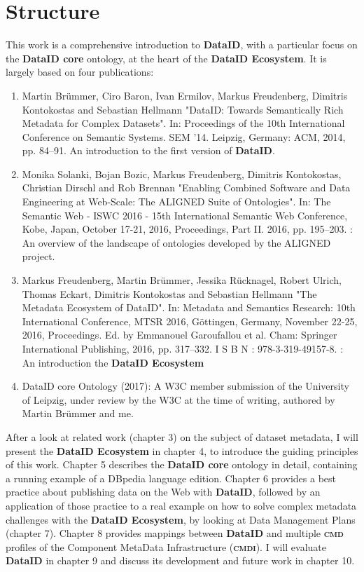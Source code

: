 \documentclass[a4paper,english,twoside,BCOR1.5cm,headsepline,DIV12,appendixprefix,final,12pt]{scrbook}
\newcommand{\ecosystem}{{\ttfamily\bfseries DataID Ecosystem}\xspace}
\newcommand{\dataid}{{\ttfamily\bfseries DataID}\xspace}
\newcommand{\core}{{\ttfamily\bfseries DataID core}\xspace}
\newcommand{\cmdi}{{\scshape\bfseries cmdi}\xspace}
\newcommand{\cmd}{{\scshape\bfseries cmd}\xspace}
\begin{document}
\section{Structure}
\label{sec:structure}
This work is a comprehensive introduction to \dataid, with a particular focus on the \core ontology, at the heart of the \ecosystem. It is largely based on four publications:
\begin{enumerate}
\item Martin Brümmer, Ciro Baron, Ivan Ermilov, Markus Freudenberg, Dimitris Kontokostas and Sebastian Hellmann  "DataID: Towards Semantically Rich Metadata for
Complex Datasets". In: Proceedings of the 10th International Conference on
Semantic Systems. SEM ’14. Leipzig, Germany: ACM, 2014, pp. 84–91. \cite{dataID2014}
An introduction to the first version of \dataid.
\item Monika Solanki, Bojan Bozic, Markus Freudenberg, Dimitris Kontokostas, Christian Dirschl and Rob Brennan "Enabling Combined Software and Data Engineering
at Web-Scale: The ALIGNED Suite of Ontologies". In: The Semantic Web -
ISWC 2016 - 15th International Semantic Web Conference, Kobe, Japan, October
17-21, 2016, Proceedings, Part II. 2016, pp. 195–203. \cite{SolankiBFKDB16}: An overview of the landscape of ontologies developed by the ALIGNED project.
\item Markus Freudenberg, Martin Br{\"u}mmer, Jessika R{\"u}cknagel, Robert Ulrich, Thomas Eckart, Dimitris Kontokostas and Sebastian Hellmann "The Metadata Ecosystem of DataID". In: Metadata and Semantics Research: 10th International Conference, MTSR 2016, Göttingen, Germany, November 22-25, 2016, Proceedings. Ed. by Emmanouel
Garoufallou et al. Cham: Springer International Publishing, 2016, pp. 317–332. I S B N : 978-3-319-49157-8. \cite{Freudenberg2016}: An introduction the \ecosystem
\item DataID core Ontology (2017): A W3C member submission of the University of Leipzig, under review by the W3C at the time of writing, authored by Martin Brümmer and me.
\end{enumerate}

After a look at related work (chapter 3) on the subject of dataset metadata, I will present the \ecosystem in chapter 4, to introduce the guiding principles of this work. Chapter 5 describes the \core ontology in detail, containing a running example of a  DBpedia language edition. 
Chapter 6 provides a best practice about publishing data on the Web with \dataid, followed by an application of those practice to a real example on how to solve complex metadata challenges with the \ecosystem, by looking at Data Management Plans (chapter 7).
Chapter 8 provides mappings between \dataid and multiple \cmd profiles of the Component MetaData Infrastructure (\cmdi). I will evaluate \dataid in chapter 9 and discuss its development and future work in chapter 10. 
\end{document}
